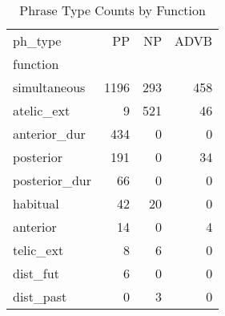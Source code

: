 \begin{table}[htbp!]
\centering
\caption{Phrase Type Counts by Function}
\label{table:funcpt_ct}
\begin{tabular}{lrrr}
\toprule
ph\_type &    PP &   NP &  ADVB \\
function      &       &      &       \\
\midrule
simultaneous  &  1196 &  293 &   458 \\
atelic\_ext    &     9 &  521 &    46 \\
anterior\_dur  &   434 &    0 &     0 \\
posterior     &   191 &    0 &    34 \\
posterior\_dur &    66 &    0 &     0 \\
habitual      &    42 &   20 &     0 \\
anterior      &    14 &    0 &     4 \\
telic\_ext     &     8 &    6 &     0 \\
dist\_fut      &     6 &    0 &     0 \\
dist\_past     &     0 &    3 &     0 \\
\bottomrule
\end{tabular}
\end{table}
